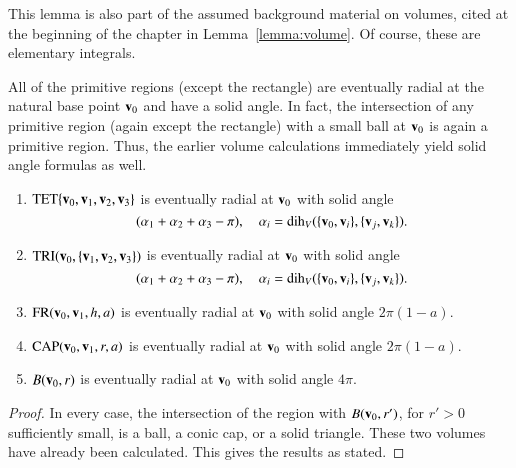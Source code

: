 This lemma is also part of the assumed background material on volumes,
cited at the beginning of the chapter in Lemma~\ref{lemma:volume}.
Of course, these are elementary integrals.







All of the primitive regions (except the rectangle) 
are eventually radial at the natural
base point ${\mathbf v}_0$ and have a
solid angle.  In fact, the intersection of any primitive region (again except
the rectangle) with a small ball at ${\mathbf v}_0$ is again a primitive region.  Thus,
the earlier volume calculations immediately yield solid angle formulas as well.
%

\begin{lemma} \label{lemma:prim-sol}
\begin{enumerate}
\item ${\operatorname{TET}}\{{\mathbf v}_0,{\mathbf v}_1,{\mathbf v}_2,{\mathbf v}_3\}$ is eventually radial at ${\mathbf v}_0$
with solid angle
\[ 
(\alpha_1+\alpha_2+\alpha_3-\pi),\quad
\alpha_i=\operatorname{dih}_V(\{{\mathbf v}_0,{\mathbf v}_i\},\{{\mathbf v}_j,{\mathbf v}_k\}).
\] 
\item  ${\operatorname{TRI}}({\mathbf v}_0,\{{\mathbf v}_1,{\mathbf v}_2,{\mathbf v}_3\})$ is eventually radial at ${\mathbf v}_0$
with solid angle 
\[ 
(\alpha_1+\alpha_2+\alpha_3-\pi),\quad
\alpha_i=\operatorname{dih}_V(\{{\mathbf v}_0,{\mathbf v}_i\},\{{\mathbf v}_j,{\mathbf v}_k\}).
\] 
\item ${\operatorname{FR}}({\mathbf v}_0,{\mathbf v}_1,h,a)$ is eventually radial at ${\mathbf v}_0$ with solid
angle        $2\pi (1-a)$.
\item ${\operatorname{CAP}}({\mathbf v}_0,{\mathbf v}_1,r,a)$ is eventually radial at ${\mathbf v}_0$ with solid
angle 
$2\pi(1-a)$.
\item $B({\mathbf v}_0,r)$ is eventually radial at ${\mathbf v}_0$ with solid
angle 
$4\pi$.
%
\end{enumerate}
\end{lemma}
%
%
%
%

\begin{proof} In every case, the intersection of 
the region with $B({\mathbf v}_0,r')$, for $r'>0$ sufficiently small, is a ball,
a conic cap, or a solid triangle.  These two volumes have
already been calculated.  This gives the results as stated.
\end{proof}

